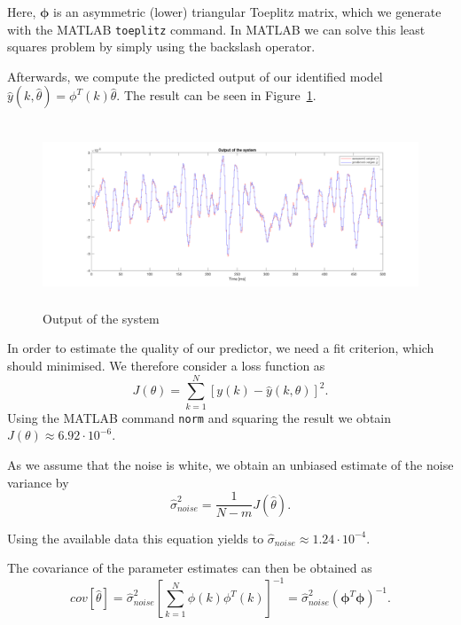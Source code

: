 \documentclass{scrartcl}
\begin{document}
Here, $\pmb{\phi}$ is an asymmetric (lower) triangular Toeplitz matrix, which we generate with the MATLAB \texttt{toeplitz} command.
In MATLAB we can solve this least squares problem by simply using the backslash operator. 

Afterwards, we compute the predicted output of our identified model $\hat{y} (k,\hat{\theta}) = \phi^{T} (k) \hat{\theta}$. The result can be seen in Figure~\ref{fig:output_fir}.

\begin{figure}[h]
	\centering
	\includegraphics[height=5.5cm]{figures/output.png}
	\caption{Output of the system}\label{fig:output_fir}
\end{figure}

In order to estimate the quality of our predictor, we need a fit criterion, which should minimised. We therefore consider a loss function as 
\begin{equation}\label{eq:J}
	J(\theta) = \sum\limits_{k=1}^N \left[y(k) - \hat{y}(k,\theta) \right]^2.
\end{equation}
Using the MATLAB command \texttt{norm} and squaring the result we obtain $ J(\theta) \approx 6.92 \cdot 10^{-6}$. 

As we assume that the noise is white, we obtain an unbiased estimate of the noise variance by
\begin{equation}\label{eq:sigma}
	\hat{\sigma}_{noise}^{2} = \frac{1}{N-m} J(\hat{\theta}) .
\end{equation}

Using the available data this equation yields to $ \hat{\sigma}_{noise} \approx 1.24 \cdot 10^{-4} $.

The covariance of the parameter estimates can then be obtained as
\begin{equation}\label{eq:cov}
	cov[\hat{\theta}] = \hat{\sigma}_{noise}^2 \left[ \sum\limits_{k=1}^N \phi(k)\phi^T(k) \right]^{-1} = \hat{\sigma}_{noise}^2 \left( \pmb{\phi}^T \pmb{\phi} \right)^{-1} .
\end{equation}
\end{document}
